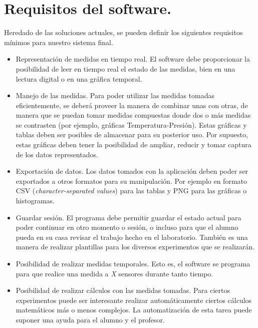 \documentclass[11pt, a4paper, twoside, titlepage]{book}
\begin{document}
	\section*{Requisitos del software.}
		Heredado de las soluciones actuales, se pueden definir los siguientes requisitos mínimos para nuestro sistema final.
	\begin{itemize}
		\item{Representación de medidas en tiempo real. }El software debe proporcionar la posibilidad de leer en tiempo real el estado de las medidas, bien en una lectura digital o en una gráfica temporal.
		\item{Manejo de las medidas. }Para poder utilizar las medidas tomadas eficientemente, se deberá proveer la manera de combinar unas con otras, de manera que se puedan tomar medidas compuestas donde dos o más medidas se contrasten (por ejemplo, gráficas Temperatura-Presión). Estas gráficas y tablas deben ser posibles de almacenar para su posterior uso. Por supuesto, estas gráficas deben tener la posibilidad de ampliar, reducir y tomar captura de los datos representados.
		\item{Exportación de datos. }Los datos tomados con la aplicación deben poder ser exportados a otros formatos para su manipulación. Por ejemplo en formato CSV (\textit{character-separated values}) para las tablas y PNG para las gráficas o histogramas.
		\item{Guardar sesión. }El programa debe permitir guardar el estado actual para poder continuar en otro momento o sesión, o incluso para que el alumno pueda en su casa revisar el trabajo hecho en el laboratorio. También es una manera de realizar plantillas para los diversos experimentos que se realizarán.
		\item{Posibilidad de realizar medidas temporales. }Esto es, el software se programa para que realice una medida a \textit{X} sensores durante tanto tiempo.
		\item{Posibilidad de realizar cálculos con las medidas tomadas. }Para ciertos experimentos puede ser interesante realizar automáticamente ciertos cálculos matemáticos más o menos complejos. La automatización de esta tarea puede suponer una ayuda para el alumno y el profesor.
	\end{itemize}
	
\end{document}
